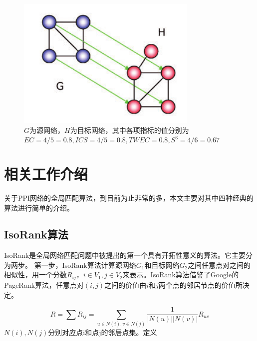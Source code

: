 \begin{figure}[htbp]
\centering
\includegraphics[height=0.25\textheight]{pic/measure.png}
\captionsetup{margin=50pt}
\caption{$G$为源网络，$H$为目标网络，其中各项指标的值分别为$EC=4/5=0.8,ICS=4/5=0.8,TWEC=0.8,S^3=4/6=0.67$ \cite{saraph2014magna} \label{fig:measure}}
\end{figure}

\section{相关工作介绍}
关于PPI网络的全局匹配算法，到目前为止非常的多，本文主要对其中四种经典的算法进行简单的介绍。
\subsection{IsoRank算法}
IsoRank是全局网络匹配问题中被提出的第一个具有开拓性意义的算法。它主要分为两步。
第一步，IsoRank算法计算源网络$G_1$和目标网络$G_2$之间任意点对之间的相似性，用一个分数$R_{ij}，i\in V_1,j\in V_2$来表示。IsoRank算法借鉴了Google的PageRank算法，任意点对$(i,j)$之间的价值由$i$和$j$两个点的邻居节点的价值所决定。

\begin{equation}\label{isorank1}
R=\sum R_{ij}=\sum_{u\in N(i),v\in N(j)}\frac{1}{\left | N(u) \right |\left | N(v) \right |}R_{uv}
\end{equation}
$N(i),N(j)$分别对应点i和点j的邻居点集。定义


